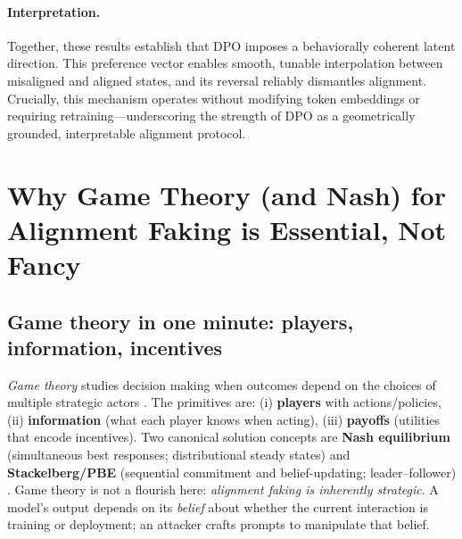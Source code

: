 \paragraph{Interpretation.}
Together, these results establish that DPO imposes a behaviorally coherent latent direction. This preference vector enables smooth, tunable interpolation between misaligned and aligned states, and its reversal reliably dismantles alignment. Crucially, this mechanism operates without modifying token embeddings or requiring retraining—underscoring the strength of DPO as a geometrically grounded, interpretable alignment protocol.
















































\clearpage
\newpage










\section{Why Game Theory (and Nash) for Alignment Faking is Essential, Not Fancy}
\label{sec:why-game-theory}

\subsection*{Game theory in one minute: players, information, incentives}
\emph{Game theory} studies decision making when outcomes depend on the choices of multiple strategic actors \citep{osborne2004game,shoham2008game}. The primitives are:
(i) \textbf{players} with actions/policies,
(ii) \textbf{information} (what each player knows when acting),
(iii) \textbf{payoffs} (utilities that encode incentives).
Two canonical solution concepts are \textbf{Nash equilibrium} (simultaneous best responses; distributional steady states) \citep{nash1951noncooperative,brown1951iterative} and \textbf{Stackelberg/PBE} (sequential commitment and belief-updating; leader--follower) \citep{conitzer2006stackelberg,tambe2011security}.
Game theory is not a flourish here: \emph{alignment faking is inherently strategic}. A model’s output depends on its \emph{belief} about whether the current interaction is training or deployment; an attacker crafts prompts to manipulate that belief.

